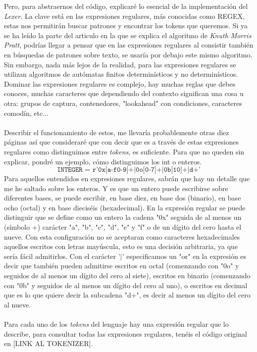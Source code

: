 Pero, para abstraernos del código, explicaré lo esencial de la implementación del \textit{Lexer}. La clave está en las expresiones regulares, más conocidas como REGEX, estas nos permitirán buscar patrones y encontrar los tokens que queremos. Si ya se ha leído la parte del articulo en la que se explica el algoritmo de \textit{Knuth Morris Pratt}, podrías llegar a pensar que en las expresiones regulares al consistir también en búsquedas de patrones sobre texto, se usaría por debajo este mismo algoritmo. Sin embargo, nada más lejos de la realidad, para las expresiones regulares se utilizan algoritmos de autómatas finitos determinísticos y no determinísticos. Dominar las expresiones regulares es complejo, hay muchas reglas que debes conoces, muchas caracteres que dependiendo del contexto significan una cosa u otra: grupos de captura, contenedores, "lookahead" con condiciones, caracteres comodín, etc... \\\\
Describir el funcionamiento de estos, me llevaría probablemente otras diez páginas así que consideraré que con decir que es a través de estas expresiones regulares como distinguimos entre \textit{tokens}, es suficiente. Para que no queden sin explicar, pondré un ejemplo, cómo distinguimos los int o enteros.
\[
\texttt{INTEGER = r'0x[a-f0-9]+|0o[0-7]+|0b[10]+|d+'}
\]
\noindent Para aquellos entendidos en expresiones regulares, sabrán que hay un detalle que me he saltado sobre los enteros. Y es que un entero puede escribirse sobre diferentes bases, se puede escribir, en base diez, en base dos (binario), en base ocho (octal) y en base dieciséis (hexadecimal). En la expresión regular se puede distinguir que se define como un entero la cadena "0x" seguida de al menos un (símbolo +) carácter "a", "b", "c", "d", "e" y "f" o de un dígito del cero hasta el nueve. Con esta configuración no se aceptaran como caracteres hexadecimales aquellos escritos con letras mayúscula, esto es una decisión arbitraria, ya que sería fácil admitirlos. Con el carácter '$|$' especificamos un "or" en la expresión es decir que también pueden admitirse escritos en octal (comenzando con "0o" y seguidos de al menos un dígito del cero al siete), escritos en binario (comenzando con "0b" y seguidos de al menos un dígito del cero al uno), o escritos en decimal que es lo que quiere decir la subcadena "d+", es decir al menos un dígito del cero al nueve. \\\\
Para cada uno de los \textit{tokens} del lenguaje hay una expresión regular que lo describe, para consultar todas las expresiones regulares, tenéis el código original en [LINK AL TOKENIZER].




